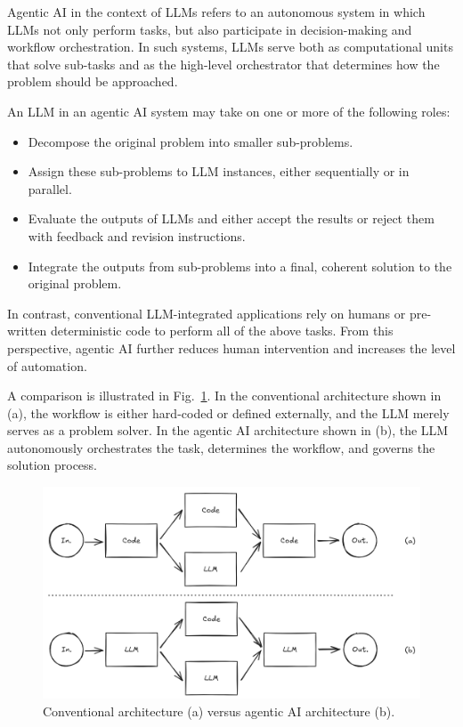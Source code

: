 Agentic AI in the context of LLMs refers to an autonomous system in which LLMs not only perform tasks, but also participate in decision-making and workflow orchestration. In such systems, LLMs serve both as computational units that solve sub-tasks and as the high-level orchestrator that determines how the problem should be approached.

An LLM in an agentic AI system may take on one or more of the following roles:
\begin{itemize}
	\item Decompose the original problem into smaller sub-problems.
	\item Assign these sub-problems to LLM instances, either sequentially or in parallel.
	\item Evaluate the outputs of LLMs and either accept the results or reject them with feedback and revision instructions.
	\item Integrate the outputs from sub-problems into a final, coherent solution to the original problem.
\end{itemize}

In contrast, conventional LLM-integrated applications rely on humans or pre-written deterministic code to perform all of the above tasks. From this perspective, agentic AI further reduces human intervention and increases the level of automation.

A comparison is illustrated in Fig.~\ref{fig:agenticwf1}. In the conventional architecture shown in (a), the workflow is either hard-coded or defined externally, and the LLM merely serves as a problem solver. In the agentic AI architecture shown in (b), the LLM autonomously orchestrates the task, determines the workflow, and governs the solution process.

\begin{figure}[!htb]
	\centering
	\includegraphics[width=\textwidth]{./chapters/part-4/figures/agenticaiworkflow.png}
	\caption{Conventional architecture (a) versus agentic AI architecture (b).}
	\label{fig:agenticwf1}
\end{figure}

